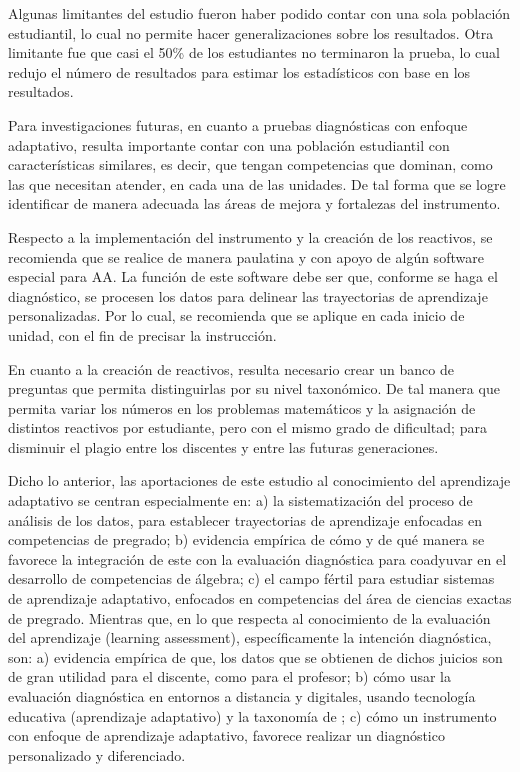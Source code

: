 \documentclass[spanish]{textolivre}
\begin{document}
Algunas limitantes del estudio fueron haber podido contar con una sola población estudiantil, lo cual no permite hacer generalizaciones sobre los resultados. Otra limitante fue que casi el 50\% de los estudiantes no terminaron la prueba, lo cual redujo el número de resultados para estimar los estadísticos con base en los resultados.

Para investigaciones futuras, en cuanto a pruebas diagnósticas con enfoque adaptativo, resulta importante contar con una población estudiantil con características similares, es decir, que tengan competencias que dominan, como las que necesitan atender, en cada una de las unidades. De tal forma que se logre identificar de manera adecuada las áreas de mejora y fortalezas del instrumento.

Respecto a la implementación del instrumento y la creación de los reactivos, se recomienda que se realice de manera paulatina y con apoyo de algún software especial para AA. La función de este software debe ser que, conforme se haga el diagnóstico, se procesen los datos para delinear las trayectorias de aprendizaje personalizadas. Por lo cual, se recomienda que se aplique en cada inicio de unidad, con el fin de precisar la instrucción. 

En cuanto a la creación de reactivos, resulta necesario crear un banco de preguntas que permita distinguirlas por su nivel taxonómico. De tal manera que permita variar los números en los problemas matemáticos y la asignación de distintos reactivos por estudiante, pero con el mismo grado de dificultad; para disminuir el plagio entre los discentes y entre las futuras generaciones. 

Dicho lo anterior, las aportaciones de este estudio al conocimiento del aprendizaje adaptativo se centran especialmente en: a) la sistematización del proceso de análisis de los datos, para establecer trayectorias de aprendizaje enfocadas en competencias de pregrado; b) evidencia empírica de cómo y de qué manera se favorece la integración de este con la evaluación diagnóstica para coadyuvar en el desarrollo de competencias de álgebra; c) el campo fértil para estudiar sistemas de aprendizaje adaptativo, enfocados en competencias del área de ciencias exactas de pregrado. Mientras que, en lo que respecta al conocimiento de la evaluación del aprendizaje (learning assessment), específicamente la intención diagnóstica, son: a) evidencia empírica de que, los datos que se obtienen de dichos juicios son de gran utilidad para el discente, como para el profesor; b) cómo usar la evaluación diagnóstica en entornos a distancia y digitales, usando tecnología educativa (aprendizaje adaptativo) y la taxonomía de \textcite{marzano2008}; c) cómo un instrumento con enfoque de aprendizaje adaptativo, favorece realizar un diagnóstico personalizado y diferenciado. 
\end{document}
